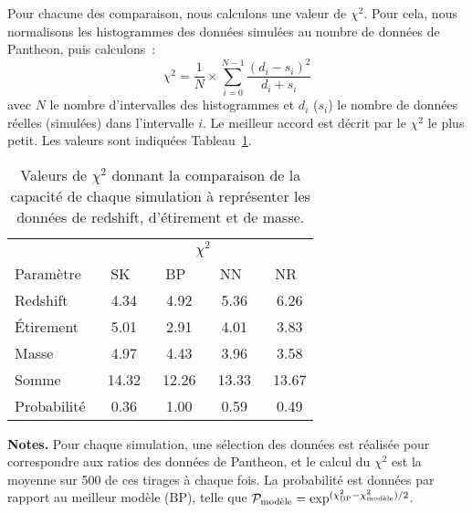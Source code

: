 \documentclass[../main/main.tex]{subfiles}
\begin{document}
Pour chacune des comparaison, nous calculons une valeur de $\chi^2$. Pour cela,
nous normalisons les histogrammes des données simulées au nombre de données de
Pantheon, puis calculons~:
\begin{equation}\label{eq:chi21d}
    \chi^2 = \frac{1}{N}\times\sum_{i=0}^{N-1} \frac{(d_i - s_i)^2}{d_i+s_i}
\end{equation}
avec $N$ le nombre d'intervalles des histogrammes et $d_i$ ($s_i$) le nombre de
données réelles (simulées) dans l'intervalle $i$. Le meilleur accord est décrit
par le $\chi^2$ le plus petit. Les valeurs sont indiquées
Tableau~\ref{tab:chi21d}.

\newcommand{\ccg}{\cellcolor{limegreen!20}}
\newcommand{\ccr}{\cellcolor{red!10}}
\newcommand{\ccy}{\cellcolor{yellow!20}}
\newcommand{\cco}{\cellcolor{orange!20}}
\begin{table}[ht]
    \centering
    \begin{threeparttable}
        \caption[Comparaison de la capacité de chaque simulation à représenter
        les données en une dimension]{Valeurs de $\chi^2$ donnant la comparaison
            de la capacité de chaque simulation à représenter les données de
        redshift, d'étirement et de masse.}
        \label{tab:chi21d}
        \begin{tabular}{lcccc}
            \toprule
                    & \multicolumn{4}{c}{$\chi^2$} \\ \cmidrule(lr){2-5}
            Paramètre & SK & BP & NN & NR \\
            \midrule
            Redshift    & \ccg\ 4.34  & \ccy\ 4.92  & \cco\ 5.36  & \ccr\ 6.26 \\
            Étirement   & \ccr\ 5.01  & \ccg\ 2.91  & \cco\ 4.01  & \ccy\ 3.83 \\
            Masse       & \ccr\ 4.97  & \cco\ 4.43  & \ccy\ 3.96  & \ccg\ 3.58 \\
            \midrule
            Somme       & \ccr\ 14.32 & \ccg\ 12.26 & \ccy\ 13.33 & \cco\ 13.67\\
            Probabilité & \ccr\ 0.36  & \ccg\ 1.00  & \ccy\ 0.59  & \cco\ 0.49 \\
            \bottomrule
        \end{tabular}
        \begin{tablenotes}[flushleft]
            \item \small \textbf{\hspace{-3,2pt}Notes.} Pour chaque simulation,
                une sélection des données est réalisée pour correspondre aux
                ratios des données de Pantheon, et le calcul du $\chi^2$ est la
                moyenne sur 500 de ces tirages à chaque fois. La probabilité est
                données par rapport au meilleur modèle (BP), telle que
                $\mathcal{P}_{\text{modèle}} =
                \exp^{(\chi^2_{\rm BP} - \chi^2_{\text{modèle}})/2}$.
        \end{tablenotes}
    \end{threeparttable}
\end{table}
\end{document}
